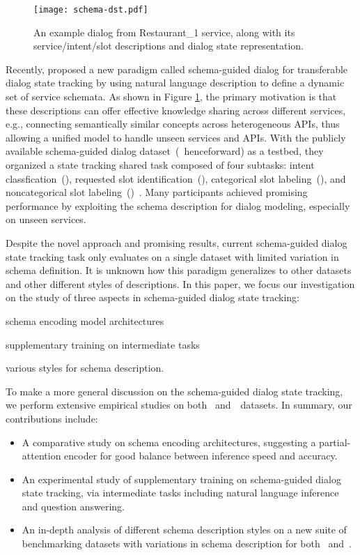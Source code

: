 \begin{figure}[!ht]
\centering
  \texttt{[image: schema-dst.pdf]}
  \caption{\label{fig:schema-dst} An example dialog from Restaurant\_1 service, along with its service/intent/slot descriptions and dialog state representation.}
\end{figure}


Recently, \citet{rastogi2019towards} proposed a new paradigm called
schema-guided dialog for transferable dialog state tracking by using
natural language description to define a dynamic set of service
schemata. As shown in Figure \ref{fig:schema-dst}, the primary
motivation is that these descriptions can offer effective knowledge
sharing across different services, e.g., connecting semantically
similar concepts across heterogeneous APIs, thus allowing a unified
model to handle unseen services and APIs. With the publicly available
schema-guided dialog dataset~(\sgdst~henceforward) as a
testbed, they organized a state tracking shared task composed of four subtasks:
intent classfication~(\IC), requested slot identification~(\RSI),
categorical slot labeling~(\CSL), and noncategorical slot
labeling~(\NSL)~\cite{rastogi2020schema}. Many participants achieved
promising performance by exploiting the schema description for dialog
modeling, especially on unseen services.

Despite the novel approach and promising results, current
schema-guided dialog state tracking task only evaluates on a single
dataset with limited variation in schema definition. It is unknown how
this paradigm generalizes to other datasets and other different styles
of descriptions. In this paper, we focus our investigation on the
study of three aspects in schema-guided dialog state tracking:
\begin{inparaenum}[(1)]
\item schema encoding model architectures
\item supplementary training on intermediate tasks
\item various styles for schema description.
\end{inparaenum}
To make a more general discussion on
the schema-guided dialog state tracking, we perform extensive
empirical studies on both \sgdst~and~\multiwoz~datasets. In summary,
our contributions include:
\begin{itemize}
\item A comparative study
  on schema encoding architectures, suggesting a partial-attention
  encoder for good balance between inference speed and accuracy.
\item An experimental study of supplementary training on
  schema-guided dialog state tracking, via intermediate tasks
  including natural language inference and question answering.
\item An in-depth analysis of different schema description styles on a new
  suite of benchmarking datasets with
  variations in schema description for both \sgdst~and~\multiwoz.
\end{itemize}

